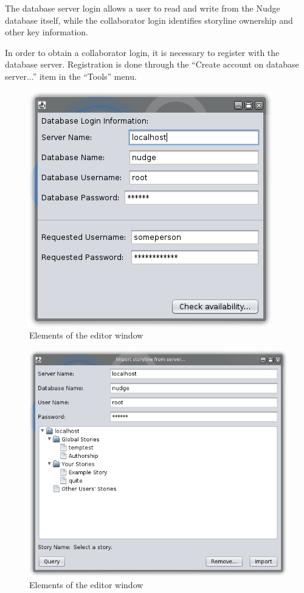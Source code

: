 \documentclass[12pt,letterpaper]{article}
\begin{document}
The database server login allows a user to read and write from the Nudge database itself, while the collaborator login identifies storyline ownership and other key information.

In order to obtain a collaborator login, it is necessary to register with the database server. Registration is done
through the ``Create account on database server...'' item in the ``Tools'' menu. 

\begin{figure}
    \begin{center}
        \includegraphics[scale=1]{registrationwindow.png}
    \end{center}
    \caption{Elements of the editor window}
\end{figure}

\begin{figure}
    \begin{center}
        \includegraphics[scale=1]{importwindow.png}
    \end{center}
    \caption{Elements of the editor window}
\end{figure}
\end{document}
